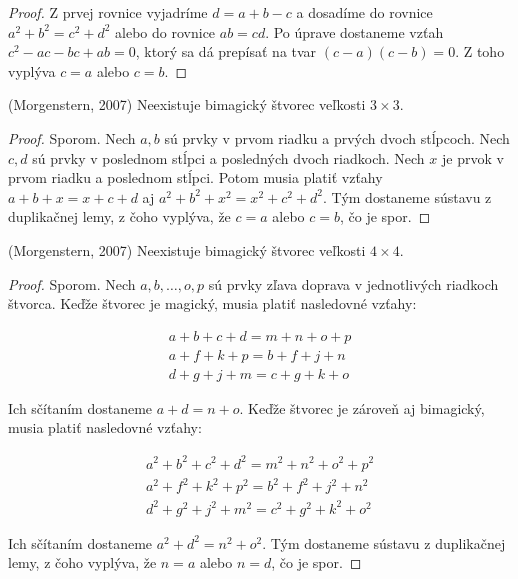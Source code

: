 \begin{proof} Z prvej rovnice vyjadríme $d = a + b - c$ a dosadíme do rovnice $a^2 + b^2 = c^2 + d^2$ alebo do rovnice $ab = cd$. Po úprave dostaneme vzťah $c^2 - ac - bc + ab = 0$, ktorý sa dá prepísať na tvar $(c - a)(c - b) = 0$. Z toho vyplýva $c = a$ alebo $c = b$.
\end{proof} 

\begin{theorem} (Morgenstern, 2007) Neexistuje bimagický štvorec veľkosti $3 \times 3$.
\end{theorem}

\begin{proof} Sporom. Nech $a,b$ sú prvky v prvom riadku a prvých dvoch stĺpcoch. Nech $c,d$ sú prvky v poslednom stĺpci a posledných dvoch riadkoch. Nech $x$ je prvok v prvom riadku a poslednom stĺpci. Potom musia platiť vzťahy $a + b + x = x + c + d$ aj $a^2 + b^2 + x^2 = x^2 + c^2 + d^2$. Tým dostaneme sústavu z duplikačnej lemy, z čoho vyplýva, že $c = a$ alebo $c = b$, čo je spor.
\end{proof} 

\begin{theorem} (Morgenstern, 2007) Neexistuje bimagický štvorec veľkosti $4 \times 4$.
\end{theorem}

\begin{proof} Sporom. Nech $a, b, \dots , o, p$ sú prvky zľava doprava v jednotlivých riadkoch štvorca. Keďže štvorec je magický, musia platiť nasledovné vzťahy:

\begin{gather*}
a + b + c + d = m + n + o + p \\
a + f + k + p = b + f + j + n \\
d + g + j + m = c + g + k + o
\end{gather*}

Ich sčítaním dostaneme $a + d = n + o$. Keďže štvorec je zároveň aj bimagický, musia platiť nasledovné vzťahy:

\begin{gather*}
a^2 + b^2 + c^2 + d^2 = m^2 + n^2 + o^2 + p^2 \\
a^2 + f^2 + k^2 + p^2 = b^2 + f^2 + j^2 + n^2 \\
d^2 + g^2 + j^2 + m^2 = c^2 + g^2 + k^2 + o^2
\end{gather*}

Ich sčítaním dostaneme $a^2 + d^2 = n^2 + o^2$. Tým dostaneme sústavu z duplikačnej lemy, z čoho vyplýva, že $n = a$ alebo $n = d$, čo je spor.
\end{proof} 

